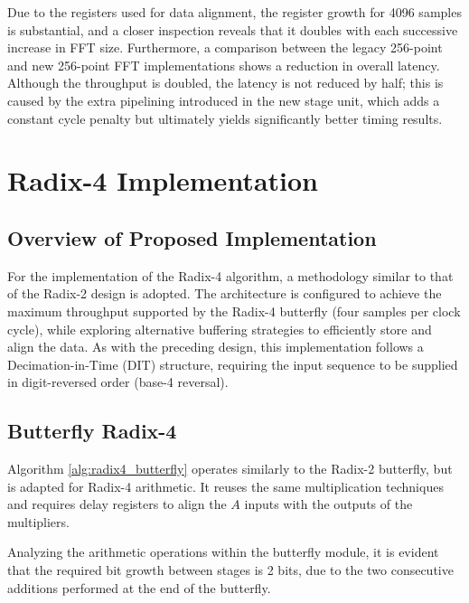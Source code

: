 Due to the registers used for data alignment, the register growth for 4096 samples is substantial, and a closer inspection reveals that it doubles with each successive increase in FFT size. Furthermore, a comparison between the legacy 256-point and new 256-point FFT implementations shows a reduction in overall latency. Although the throughput is doubled, the latency is not reduced by half; this is caused by the extra pipelining introduced in the new stage unit, which adds a constant cycle penalty but ultimately yields significantly better timing results.

\section{Radix-4 Implementation}

\subsection{Overview of Proposed Implementation}
For the implementation of the Radix-4 algorithm, a methodology similar to that of the Radix-2 design is adopted. The architecture is configured to achieve the maximum throughput supported by the Radix-4 butterfly (four samples per clock cycle), while exploring alternative buffering strategies to efficiently store and align the data. As with the preceding design, this implementation follows a Decimation-in-Time (DIT) structure, requiring the input sequence to be supplied in digit-reversed order (base-4 reversal).

\subsection{Butterfly Radix-4}
Algorithm \ref{alg:radix4_butterfly} operates similarly to the Radix-2 butterfly, but is adapted for Radix-4 arithmetic. It reuses the same multiplication techniques and requires delay registers to align the $A$ inputs with the outputs of the multipliers.

Analyzing the arithmetic operations within the butterfly module, it is evident that the required bit growth between stages is 2 bits, due to the two consecutive additions performed at the end of the butterfly.

